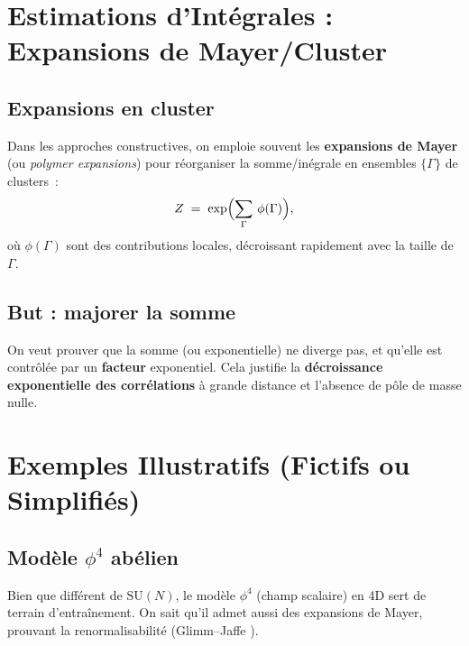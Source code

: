\vspace{1em}

\section{Estimations d’Intégrales : Expansions de Mayer/Cluster}
\label{sec:B.2}

\subsection*{Expansions en cluster}
Dans les approches constructives, on emploie souvent les \textbf{expansions de Mayer} (ou \textit{polymer expansions}) pour réorganiser la somme/inégrale en ensembles \(\{\Gamma\}\) de \og clusters\fg\ :
\[
Z \;=\; \exp\Bigl(\sum_{\Gamma}\,\phi(\Gamma)\Bigr),
\]
où \(\phi(\Gamma)\) sont des contributions locales, décroissant rapidement avec la taille de \(\Gamma\).

\subsection*{But : majorer la somme}
On veut prouver que la somme (ou exponentielle) ne diverge pas, et qu’elle est contrôlée par un \textbf{facteur} exponentiel. Cela justifie la \textbf{décroissance exponentielle des corrélations} à grande distance et l’absence de \og pôle de masse nulle\fg.

\vspace{1em}

\section{Exemples Illustratifs (Fictifs ou Simplifiés)}
\label{sec:B.3}

\subsection*{Modèle \(\phi^4\) abélien}
Bien que différent de \(\mathrm{SU}(N)\), le modèle \(\phi^4\) (champ scalaire) en 4D sert de terrain d’entraînement. On sait qu’il admet aussi des expansions de Mayer, prouvant la renormalisabilité (Glimm--Jaffe \cite{GlimmJaffe1987}).

